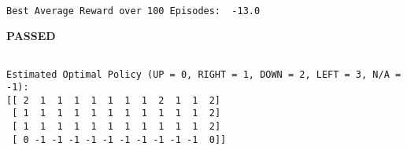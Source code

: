 \documentclass[11pt]{article}
\begin{document}
    \begin{center}
    \end{center}
    { \hspace*{\fill} \\}
    
    \begin{Verbatim}[commandchars=\\\{\}]
Best Average Reward over 100 Episodes:  -13.0

    \end{Verbatim}

    \textbf{{PASSED}}

    
    \begin{Verbatim}[commandchars=\\\{\}]

Estimated Optimal Policy (UP = 0, RIGHT = 1, DOWN = 2, LEFT = 3, N/A = -1):
[[ 2  1  1  1  1  1  1  1  2  1  1  2]
 [ 1  1  1  1  1  1  1  1  1  1  1  2]
 [ 1  1  1  1  1  1  1  1  1  1  1  2]
 [ 0 -1 -1 -1 -1 -1 -1 -1 -1 -1 -1  0]]

    \end{Verbatim}
\end{document}
